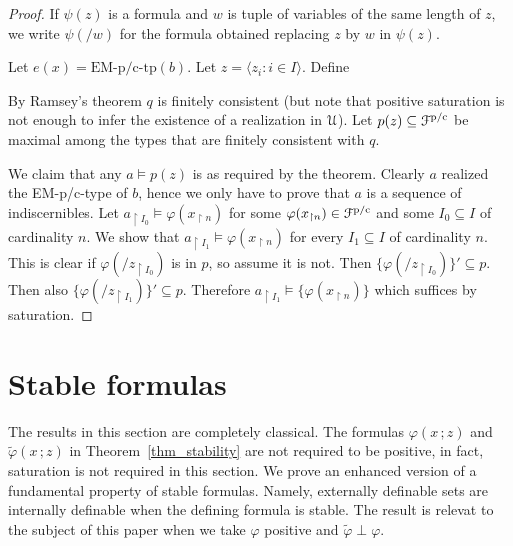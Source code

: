 \documentclass{amsproc}
\begin{document}
{\begin{proof}
  If $\psi(z)$ is a formula and $w$ is tuple of variables of the same length of $z$, we write $\psi(/w)$ for the formula obtained replacing $z$ by $w$ in $\psi(z)$.

  Let $e(x)=\mbox{EM-p/c-tp}(b)$.
  Let $z=\langle z_i:i\in I\rangle$.
  Define



  By Ramsey's theorem $q$ is finitely consistent (but note that positive saturation is not enough to infer the existence of a realization in ${\EuScript U}$).
  Let $p(z)\subseteq{\EuScript F}^{\rm p/c}$ be maximal among the types that are finitely consistent with $q$.

  We claim that any $a\models p(z)$ is as required by the theorem.
  Clearly $a$ realized the EM-p/c-type of $b$, hence we only have to prove that $a$ is a sequence of indiscernibles.
  Let $a_{\restriction I_0}\models\varphi(x_{\restriction n})$ for some $\varphi(x_{\restriction n})\in{\EuScript F}^{\rm p/c}$ and some $I_0\subseteq I$ of cardinality $n$.
  We show that $a_{\restriction I_1}\models\varphi(x_{\restriction n})$ 
  for every $I_1\subseteq I$ of cardinality $n$.
  This is clear if $\varphi(/z_{\restriction I_0})$ is in $p$, so assume it is not.
  Then $\{\varphi(/z_{\restriction I_0})\}'\subseteq p$.
  Then also $\{\varphi(/z_{\restriction I_1})\}'\subseteq p$.
  Therefore  $a_{\restriction I_1}\models\{\varphi(x_{\restriction n})\}$ which suffices by saturation.
\end{proof}


\section{Stable formulas}

\def\ceq#1#2#3{\parbox[t]{24ex}{$\displaystyle #1$}\parbox[t]{6ex}{$\displaystyle\hfil #2$}{$\displaystyle #3$}}

The results in this section are completely classical.
The formulas $\varphi(x\,;z)$ and $\tilde\varphi(x\,;z)$ in Theorem~\ref{thm_stability} are not required to be positive, in fact, saturation is not required in this section. 
We prove an enhanced version of a fundamental property of stable formulas.
Namely, externally definable sets are internally definable when the defining formula is stable.
The result is relevat to the subject of this paper when we take $\varphi$ positive and $\tilde\varphi\perp\varphi$.

}
\end{document}
